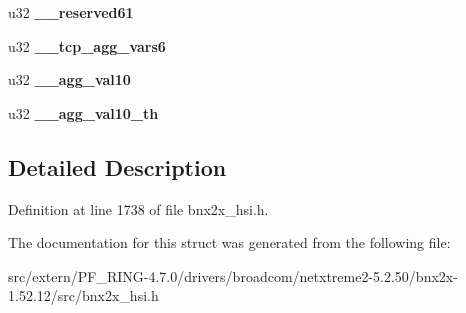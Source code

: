 \begin{DoxyCompactItemize}
\item 
\hypertarget{structxstorm__eth__extra__ag__context__section_a130bac78df7bc993c60351fa296e09cb}{
u32 {\bfseries \_\-\_\-reserved61}}
\label{structxstorm__eth__extra__ag__context__section_a130bac78df7bc993c60351fa296e09cb}

\item 
\hypertarget{structxstorm__eth__extra__ag__context__section_a367a1dbc988de2bbf541655caf770e1e}{
u32 {\bfseries \_\-\_\-tcp\_\-agg\_\-vars6}}
\label{structxstorm__eth__extra__ag__context__section_a367a1dbc988de2bbf541655caf770e1e}

\item 
\hypertarget{structxstorm__eth__extra__ag__context__section_a1545a01f0bcbe90e0c29265f333a7680}{
u32 {\bfseries \_\-\_\-agg\_\-val10}}
\label{structxstorm__eth__extra__ag__context__section_a1545a01f0bcbe90e0c29265f333a7680}

\item 
\hypertarget{structxstorm__eth__extra__ag__context__section_ab66ad21e4e4148f93167d1db2ab70b12}{
u32 {\bfseries \_\-\_\-agg\_\-val10\_\-th}}
\label{structxstorm__eth__extra__ag__context__section_ab66ad21e4e4148f93167d1db2ab70b12}

\end{DoxyCompactItemize}


\subsection{Detailed Description}


Definition at line 1738 of file bnx2x\_\-hsi.h.



The documentation for this struct was generated from the following file:\begin{DoxyCompactItemize}
\item 
src/extern/PF\_\-RING-\/4.7.0/drivers/broadcom/netxtreme2-\/5.2.50/bnx2x-\/1.52.12/src/bnx2x\_\-hsi.h\end{DoxyCompactItemize}

